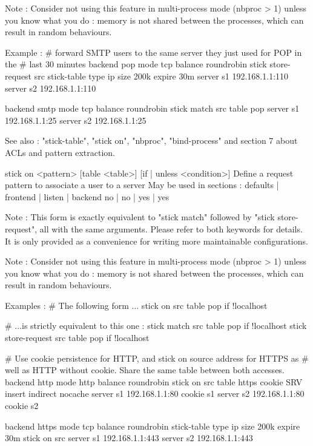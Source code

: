   Note : Consider not using this feature in multi-process mode (nbproc > 1)
         unless you know what you do : memory is not shared between the
         processes, which can result in random behaviours.

  Example :
    # forward SMTP users to the same server they just used for POP in the
    # last 30 minutes
    backend pop
        mode tcp
        balance roundrobin
        stick store-request src
        stick-table type ip size 200k expire 30m
        server s1 192.168.1.1:110
        server s2 192.168.1.1:110

    backend smtp
        mode tcp
        balance roundrobin
        stick match src table pop
        server s1 192.168.1.1:25
        server s2 192.168.1.1:25

  See also : "stick-table", "stick on", "nbproc", "bind-process" and section 7
             about ACLs and pattern extraction.


stick on <pattern> [table <table>] [{if | unless} <condition>]
  Define a request pattern to associate a user to a server
  May be used in sections :   defaults | frontend | listen | backend
                                 no    |    no    |   yes  |   yes

  Note : This form is exactly equivalent to "stick match" followed by
         "stick store-request", all with the same arguments. Please refer
         to both keywords for details. It is only provided as a convenience
         for writing more maintainable configurations.

  Note : Consider not using this feature in multi-process mode (nbproc > 1)
         unless you know what you do : memory is not shared between the
         processes, which can result in random behaviours.

  Examples :
    # The following form ...
    stick on src table pop if !localhost

    # ...is strictly equivalent to this one :
    stick match src table pop if !localhost
    stick store-request src table pop if !localhost


    # Use cookie persistence for HTTP, and stick on source address for HTTPS as
    # well as HTTP without cookie. Share the same table between both accesses.
    backend http
        mode http
        balance roundrobin
        stick on src table https
        cookie SRV insert indirect nocache
        server s1 192.168.1.1:80 cookie s1
        server s2 192.168.1.1:80 cookie s2

    backend https
        mode tcp
        balance roundrobin
        stick-table type ip size 200k expire 30m
        stick on src
        server s1 192.168.1.1:443
        server s2 192.168.1.1:443

